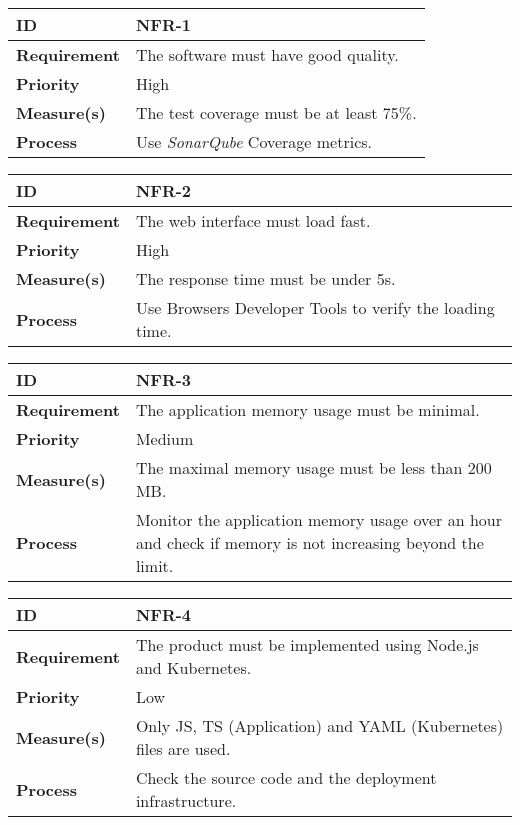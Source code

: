 \begin{center}
\begin{tabular}{ | m{8em} | m{25em}| } 
 \hline
 \textbf{ID} & NFR-1\\ 
 \hline
 \textbf{Requirement} & The software must have good quality. \\
 \hline
 \textbf{Priority} & High\\
 \hline
 \textbf{Measure(s)} & The test coverage must be at least 75\%.\\
 \hline
 \textbf{Process} & Use \textit{SonarQube} Coverage metrics. \\
 \hline
\end{tabular}
\end{center}

\begin{center}
\begin{tabular}{ | m{8em} | m{25em}| } 
 \hline
 \textbf{ID} & NFR-2\\ 
 \hline
 \textbf{Requirement} & The web interface must load fast.\\
 \hline
 \textbf{Priority} & High\\
 \hline
 \textbf{Measure(s)} & The response time must be under 5s.\\
 \hline
 \textbf{Process} & Use Browsers Developer Tools to verify the loading time.\\
 \hline
\end{tabular}
\end{center}

\begin{center}
\begin{tabular}{ | m{8em} | m{25em}| } 
 \hline
 \textbf{ID} & NFR-3\\ 
 \hline
 \textbf{Requirement} & The application memory usage must be minimal.\\
 \hline
 \textbf{Priority} & Medium\\
 \hline
 \textbf{Measure(s)} & The maximal memory usage must be less than 200 MB.\\
 \hline
 \textbf{Process} & Monitor the application memory usage over an hour and check if memory is not increasing beyond the limit.\\
 \hline
\end{tabular}
\end{center}

\begin{center}
\begin{tabular}{ | m{8em} | m{25em}| } 
 \hline
 \textbf{ID} & NFR-4\\ 
 \hline
 \textbf{Requirement} & The product must be implemented using Node.js and Kubernetes.\\
 \hline
 \textbf{Priority} & Low\\
 \hline
 \textbf{Measure(s)} & Only JS, TS (Application) and YAML (Kubernetes) files are used.\\
 \hline
 \textbf{Process} & Check the source code and the deployment infrastructure.\\
 \hline
\end{tabular}
\end{center}

